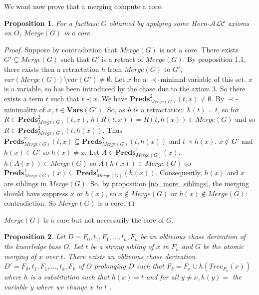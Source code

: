 \documentclass{article}
\newtheorem{proposition}{Proposition}[section]
\theoremstyle{definition}
\theoremstyle{remark}
\newcommand{\Vars}{\textbf{Vars}}
\newcommand{\Preds}{\textbf{Preds}}
\newcommand{\Merge}{\textit{Merge}}
\newcommand{\Tree}{\textit{Tree}}
\begin{document}
We want now prove that a merging compute a core:

\begin{proposition} 
For a factbase $G$ obtained by applying some Horn-$\mathcal{ALC}$ axioms on $O$, $\Merge(G)$ is a core.
\end{proposition}

\begin{proof}
Suppose by contradiction that $\Merge(G)$ is not a core. There exists $G' \subsetneq \Merge(G)$ such that $G'$ is a retract of $\Merge(G)$. By proposition 1.1, there exists then a retractation $h$ from $\Merge(G)$ to $G'$, $var(\Merge(G))\setminus var(G') \neq \emptyset$. Let $x$ be a $\prec$-minimal variable of this set. $x$ is a variable, so has been introduced by the chase due to the axiom 3. So there exists a term $t$ such that $t \prec x$. We have $\Preds^2_{\Merge(G)}(t,x) \neq \emptyset$. By $\prec$-minimality of $x$, $t \in \Vars(G')$. So, as $h$ is a retractation: $h(t) = t$, so for $R \in \Preds^2_{\Merge(G)}(t,x)$, $h(R(t,x)) = R(t,h(x)) \in \Merge(G)$ and so $R \in \Preds^2_{\Merge(G)}(t,h(x))$. Thus $\Preds^2_{\Merge(G)}(t,x) \subseteq \Preds^2_{\Merge(G)}(t,h(x))$ and $t \prec h(x)$. $x \notin G'$ and $h(x) \in G'$ so $h(x) \neq x$. Let $A \in \Preds^1_{\Merge(G)}(x)$. $h(A(x)) \in \Merge(G)$ so $A(h(x)) \in \Merge(G)$ so $\Preds^1_{\Merge(G)}(x) \subseteq \Preds^1_{\Merge(G)}(h(x))$. Consequently, $h(x)$ and $x$ are siblings in $\Merge(G)$. So, by proposition \ref{no_more_siblings}, the merging should have suppress $x$ or $h(x)$, so $x \notin \Merge(G)$ or $h(x) \notin \Merge(G)$: contradiction. So $\Merge(G)$ is a core.
\end{proof}	

$\Merge(G)$ is a core but not necessarily the core of $G$.

\begin{proposition}
Let $D = F_0,t_1,F_1,\ldots, t_n,F_n$ be an oblivious chase derivation of the knowledge base $O$. Let $t$ be a strong sibling of $x$ in $F_n$ and $G$ be the atomic merging of $x$ over $t$. There exists an oblivious chase derivation $D' = F_0,t_1,F_1,\ldots,t_k,F_k$ of $O$ prolonging $D$ such that $F_k = F_n \cup h(\Tree_{F_n}(x))$ where $h$ is a substitution such that $h(x) =t$ and for all $y \neq x, h(y)=$ the variable $y$ where we change $x$ to $t$ .
\end{proposition}
\end{document}
